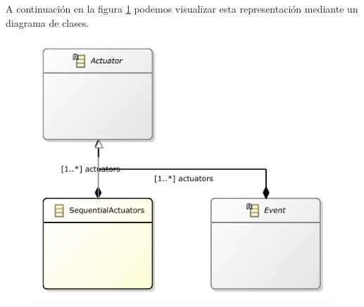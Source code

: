 A continuación en la figura \ref{fig:modelo_events_classes} podemos visualizar esta representación mediante un diagrama de clases.

\begin{figure}[htp]
	\centering
    \includegraphics[height=0.3\textheight]{images/models/events_class_diagram.pdf}
    \label{fig:modelo_events_classes}
\end{figure}

